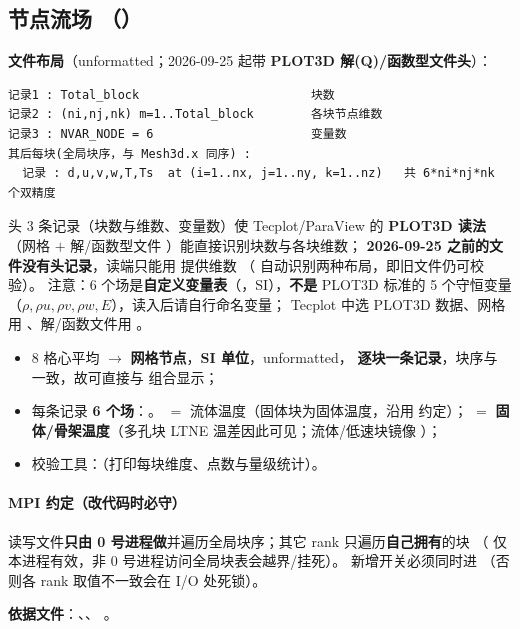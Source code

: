 \subsection{节点流场 （）}
\textbf{文件布局}（unformatted；2026-09-25 起带 \textbf{PLOT3D 解(Q)/函数型文件头}）：
\begin{lstlisting}
记录1 : Total_block                        块数
记录2 : (ni,nj,nk) m=1..Total_block        各块节点维数
记录3 : NVAR_NODE = 6                      变量数
其后每块(全局块序，与 Mesh3d.x 同序) :
  记录 : d,u,v,w,T,Ts  at (i=1..nx, j=1..ny, k=1..nz)   共 6*ni*nj*nk 个双精度
\end{lstlisting}
头 3 条记录（块数与维数、变量数）使 Tecplot/ParaView 的 \textbf{PLOT3D 读法}
（网格  $+$ 解/函数型文件 ）能直接识别块数与各块维数；
\textbf{2026-09-25 之前的文件没有头记录}，读端只能用  提供维数
（ 自动识别两种布局，即旧文件仍可校验）。
注意：6 个场是\textbf{自定义变量表}（，SI），\textbf{不是} PLOT3D 标准的
5 个守恒变量（$\rho,\rho u,\rho v,\rho w,E$），读入后请自行命名变量；
Tecplot 中选 PLOT3D 数据、网格用 、解/函数文件用 。
\begin{itemize}
  \item 8 格心平均 $\to$ \textbf{网格节点}，\textbf{SI 单位}，unformatted，
        \textbf{逐块一条记录}，块序与  一致，故可直接与  组合显示；
  \item 每条记录 \textbf{6 个场}：。
         $=$ 流体温度（固体块为固体温度，沿用  约定）；
         $=$ \textbf{固体/骨架温度}（多孔块 LTNE 温差因此可见；流体/低速块镜像 ）；
  \item 校验工具：（打印每块维度、点数与量级统计）。
\end{itemize}

\paragraph{MPI 约定（改代码时必守）}
读写文件\textbf{只由 0 号进程做}并遍历全局块序；其它 rank 只遍历\textbf{自己拥有}的块
（ 仅本进程有效，非 0 号进程访问全局块表会越界/挂死）。
新增开关必须同时进 （否则各 rank 取值不一致会在 I/O 处死锁）。

\noindent\textbf{依据文件}：、、
。
